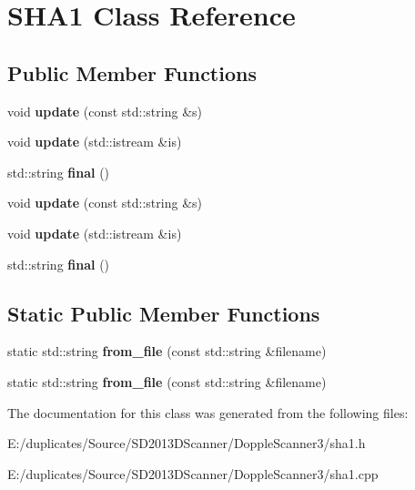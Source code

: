 \hypertarget{class_s_h_a1}{\section{S\-H\-A1 Class Reference}
\label{class_s_h_a1}
}
\subsection*{Public Member Functions}
\begin{DoxyCompactItemize}
\item 
\hypertarget{class_s_h_a1_aec3a46058baf8b4169389c89e3a0a2f4}{void {\bfseries update} (const std\-::string \&s)}\label{class_s_h_a1_aec3a46058baf8b4169389c89e3a0a2f4}

\item 
\hypertarget{class_s_h_a1_a71d172f1d0b34c5a381ccdfce5aa6ab5}{void {\bfseries update} (std\-::istream \&is)}\label{class_s_h_a1_a71d172f1d0b34c5a381ccdfce5aa6ab5}

\item 
\hypertarget{class_s_h_a1_a89ba0f16575431b0942cbbcfb29107db}{std\-::string {\bfseries final} ()}\label{class_s_h_a1_a89ba0f16575431b0942cbbcfb29107db}

\item 
\hypertarget{class_s_h_a1_aec3a46058baf8b4169389c89e3a0a2f4}{void {\bfseries update} (const std\-::string \&s)}\label{class_s_h_a1_aec3a46058baf8b4169389c89e3a0a2f4}

\item 
\hypertarget{class_s_h_a1_a71d172f1d0b34c5a381ccdfce5aa6ab5}{void {\bfseries update} (std\-::istream \&is)}\label{class_s_h_a1_a71d172f1d0b34c5a381ccdfce5aa6ab5}

\item 
\hypertarget{class_s_h_a1_a89ba0f16575431b0942cbbcfb29107db}{std\-::string {\bfseries final} ()}\label{class_s_h_a1_a89ba0f16575431b0942cbbcfb29107db}

\end{DoxyCompactItemize}
\subsection*{Static Public Member Functions}
\begin{DoxyCompactItemize}
\item 
\hypertarget{class_s_h_a1_a1bec6fb50bcfb5e3f6fb5c8f258a1f41}{static std\-::string {\bfseries from\-\_\-file} (const std\-::string \&filename)}\label{class_s_h_a1_a1bec6fb50bcfb5e3f6fb5c8f258a1f41}

\item 
\hypertarget{class_s_h_a1_a72ef6f0f4c3e6a2a9d751031d3014c53}{static std\-::string {\bfseries from\-\_\-file} (const std\-::string \&filename)}\label{class_s_h_a1_a72ef6f0f4c3e6a2a9d751031d3014c53}

\end{DoxyCompactItemize}


The documentation for this class was generated from the following files\-:\begin{DoxyCompactItemize}
\item 
E\-:/duplicates/\-Source/\-S\-D2013\-D\-Scanner/\-Dopple\-Scanner3/sha1.\-h\item 
E\-:/duplicates/\-Source/\-S\-D2013\-D\-Scanner/\-Dopple\-Scanner3/sha1.\-cpp\end{DoxyCompactItemize}
